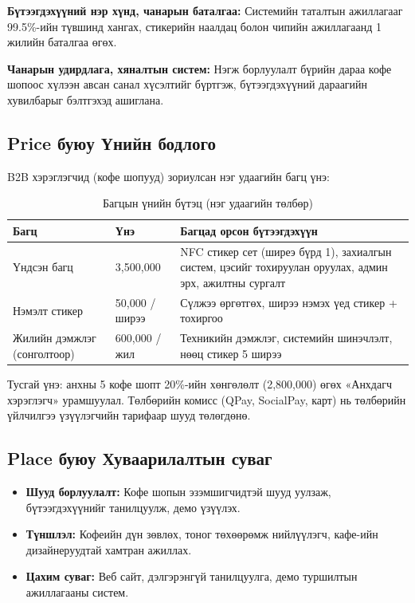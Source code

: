 \textbf{Бүтээгдэхүүний нэр хүнд, чанарын баталгаа:} Системийн
таталтын ажиллагааг 99.5\%-ийн түвшинд хангах, стикерийн наалдац
болон чипийн ажиллагаанд 1 жилийн баталгаа өгөх.

\textbf{Чанарын удирдлага, хяналтын систем:} Нэгж борлуулалт
бүрийн дараа кофе шопоос хүлээн авсан санал хүсэлтийг бүртгэж,
бүтээгдэхүүний дараагийн хувилбарыг бэлтгэхэд ашиглана.

\subsection{Price буюу Үнийн бодлого}

B2B хэрэглэгчид (кофе шопууд) зориулсан нэг удаагийн багц үнэ:

\begin{table}[h]
  \centering
  \caption{Багцын үнийн бүтэц (нэг удаагийн төлбөр)}
  \label{tab:ch3-unelgee}
  \small
  \begin{tabular}{@{}p{3.2cm}p{3.0cm}p{6.6cm}@{}}
    \toprule
    \textbf{Багц} & \textbf{Үнэ} & \textbf{Багцад орсон бүтээгдэхүүн} \\
    \midrule
    Үндсэн багц & 3{,}500{,}000 \textcurrency{} & NFC стикер сет (ширеэ
    бүрд 1), захиалгын систем, цэсийг тохируулан оруулах, админ эрх,
    ажилтны сургалт \\
    Нэмэлт стикер & 50{,}000 \textcurrency{}/ширээ & Сүлжээ өргөтгөх,
    ширээ нэмэх үед стикер + тохиргоо \\
    Жилийн дэмжлэг (сонголтоор) & 600{,}000 \textcurrency{}/жил &
    Техникийн дэмжлэг, системийн шинэчлэлт, нөөц стикер 5 ширээ \\
    \bottomrule
  \end{tabular}
\end{table}

\noindent Тусгай үнэ: анхны 5 кофе шопт 20\%-ийн хөнгөлөлт
(2{,}800{,}000\textcurrency{}) өгөх «Анхдагч хэрэглэгч» урамшуулал.
Төлбөрийн комисс (QPay, SocialPay, карт) нь төлбөрийн үйлчилгээ
үзүүлэгчийн тарифаар шууд төлөгдөнө.

\subsection{Place буюу Хуваарилалтын суваг}

\begin{itemize}
  \item \textbf{Шууд борлуулалт:} Кофе шопын эзэмшигчидтэй шууд
        уулзаж, бүтээгдэхүүнийг танилцуулж, демо үзүүлэх.
  \item \textbf{Түншлэл:} Кофеийн дүн зөвлөх, тоног төхөөрөмж
        нийлүүлэгч, кафе-ийн дизайнеруудтай хамтран ажиллах.
  \item \textbf{Цахим суваг:} Веб сайт, дэлгэрэнгүй танилцуулга,
        демо туршилтын ажиллагааны систем.
\end{itemize}

